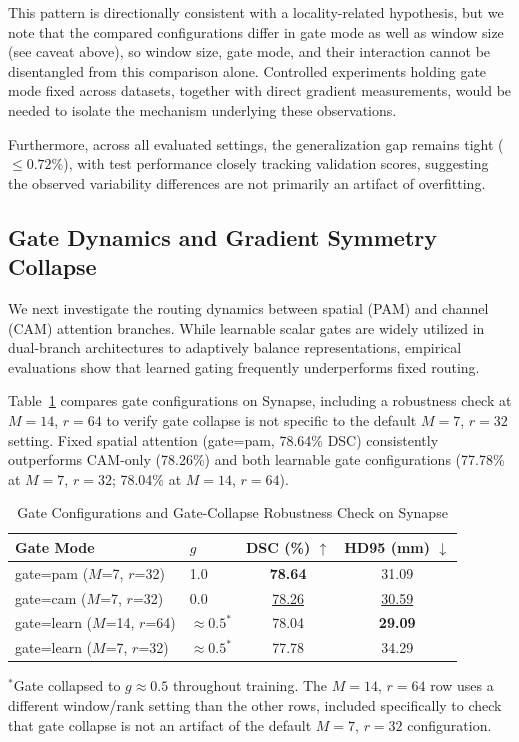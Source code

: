 This pattern is directionally consistent with a locality-related hypothesis, but we note that the compared configurations differ in gate mode as well as window size (see caveat above), so window size, gate mode, and their interaction cannot be disentangled from this comparison alone. Controlled experiments holding gate mode fixed across datasets, together with direct gradient measurements, would be needed to isolate the mechanism underlying these observations.

Furthermore, across all evaluated settings, the generalization gap remains tight ($\le 0.72\%$), with test performance closely tracking validation scores, suggesting the observed variability differences are not primarily an artifact of overfitting.

\subsection{Gate Dynamics and Gradient Symmetry Collapse}
\label{sec:collapse}

We next investigate the routing dynamics between spatial (PAM) and channel (CAM) attention branches. While learnable scalar gates are widely utilized in dual-branch architectures to adaptively balance representations, empirical evaluations show that learned gating frequently underperforms fixed routing.

Table~\ref{tab:gate_ablation} compares gate configurations on Synapse, including a robustness check at $M{=}14$, $r{=}64$ to verify gate collapse is not specific to the default $M{=}7$, $r{=}32$ setting. Fixed spatial attention (gate=pam, 78.64\% DSC) consistently outperforms CAM-only (78.26\%) and both learnable gate configurations (77.78\% at $M{=}7$, $r{=}32$; 78.04\% at $M{=}14$, $r{=}64$).

\begin{table}[ht]
  \caption{Gate Configurations and Gate-Collapse Robustness Check on Synapse}
  \label{tab:gate_ablation}
  \centering
  \setlength{\tabcolsep}{5pt}
  \small
  \begin{tabular}{llcc}
    \toprule
    Gate Mode & $g$ & DSC (\%) $\uparrow$ & HD95 (mm) $\downarrow$ \\
    \midrule
    gate=pam ($M$=7, $r$=32)    & 1.0              & \textbf{78.64} & 31.09 \\
    gate=cam ($M$=7, $r$=32)    & 0.0              & \underline{78.26}  & \underline{30.59} \\
    gate=learn ($M$=14, $r$=64) & ${\approx}0.5^*$ & 78.04          & \textbf{29.09} \\
    gate=learn ($M$=7, $r$=32)  & ${\approx}0.5^*$ & 77.78          & 34.29 \\
    \bottomrule
  \end{tabular}
  \par\vspace{5pt}
  \parbox{\columnwidth}{\footnotesize $^*$Gate collapsed to $g{\approx}0.5$ throughout training. The $M{=}14$, $r{=}64$ row uses a different window/rank setting than the other rows, included specifically to check that gate collapse is not an artifact of the default $M{=}7$, $r{=}32$ configuration.}
\end{table}

